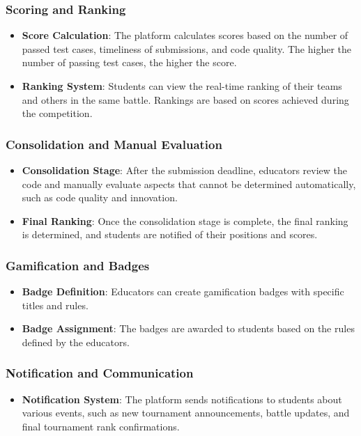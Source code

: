 \subsubsection{Scoring and Ranking}
\begin{itemize}
    \item \textbf{Score Calculation}: The platform calculates scores based on the number of passed test cases, timeliness of submissions, and code quality. The higher the number of passing test cases, the higher the score.
    \item \textbf{Ranking System}: Students can view the real-time ranking of their teams and others in the same battle. Rankings are based on scores achieved during the competition.
\end{itemize}

\subsubsection{Consolidation and Manual Evaluation}
\begin{itemize}
    \item \textbf{Consolidation Stage}: After the submission deadline, educators review the code and manually evaluate aspects that cannot be determined automatically, such as code quality and innovation.
    \item \textbf{Final Ranking}: Once the consolidation stage is complete, the final ranking is determined, and students are notified of their positions and scores.
\end{itemize}
\subsubsection{Gamification and Badges}
\begin{itemize}
    \item \textbf{Badge Definition}: Educators can create gamification badges with specific titles and rules. 
    \item \textbf{Badge Assignment}: The badges are awarded to students based on the rules defined by the educators.
\end{itemize}
\subsubsection{Notification and Communication}
\begin{itemize}
    \item \textbf{Notification System}: The platform sends notifications to students about various events, such as new tournament announcements, battle updates, and final tournament rank confirmations.
\end{itemize}

